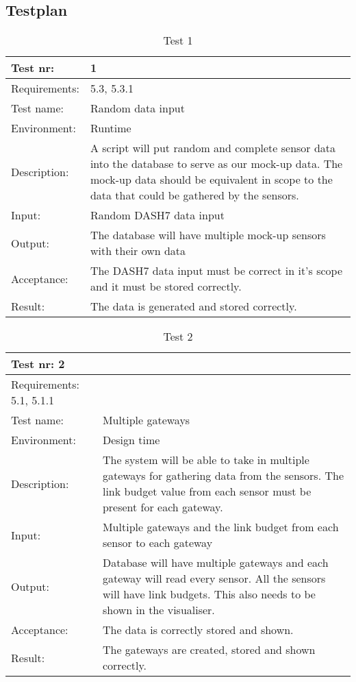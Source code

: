 \documentclass[../document]{subfiles}
\begin{document}
\subsection{Testplan}

\begin{table}[H]
\caption{Test 1}
\centering
\begin{tabularx}{\textwidth}{|l|X|}
	\hline
	Test nr:
	&1
	\\ \hline Requirements:
	&5.3, 5.3.1
	\\ \hline Test name:
	&Random data input
	\\ \hline Environment:
	&Runtime
	\\ \hline Description:
	&A script will put random and complete sensor data into the database to serve as our mock-up data. The mock-up data should be equivalent in scope to the data that could be gathered by the sensors.
	\\ \hline Input:
	&Random \gls{DASH7} data input
	\\ \hline Output:
	&The database will have multiple mock-up sensors with their own data
	\\ \hline Acceptance:
	&The \gls{DASH7} data input must be correct in it’s scope and it must be stored correctly.
	\\ \hline Result:
	&The data is generated and stored correctly.	
	\\ \hline 
\end{tabularx}
\end{table}

\begin{table}[H]
\caption{Test 2}
\centering
\begin{tabularx}{\textwidth}{|l|X|}
\hline
Test nr:
2
\\ \hline Requirements:
5.1, 5.1.1
\\ \hline Test name:
&Multiple gateways
\\ \hline Environment:
&Design time
\\ \hline Description:
&The system will be able to take in multiple gateways for gathering data from the sensors. The link budget value from each sensor must be present for each gateway.
\\ \hline Input:
&Multiple gateways and the link budget from each sensor to each gateway
\\ \hline Output:
&Database will have multiple gateways and each gateway will read every sensor. All the sensors will have link budgets. This also needs to be shown in the visualiser.  
\\ \hline Acceptance:
&The data is correctly stored and shown.
\\ \hline Result:
&The gateways are created, stored and shown correctly.
\\ \hline 
\end{tabularx}
\end{table}
\end{document}
